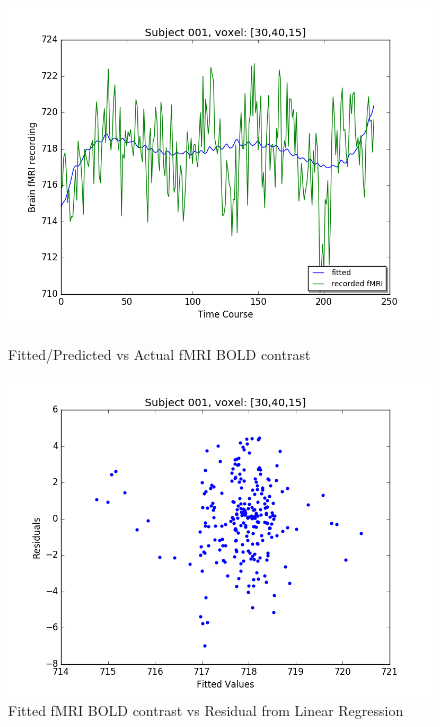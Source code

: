   
\begin{figure}[ht]
\centering
\begin{minipage}[b]{0.45\linewidth}
	\centering
	\includegraphics[width=.8\linewidth]{../images/Fitted_v_Actual.png} 
	\caption{Fitted/Predicted vs Actual fMRI BOLD contrast}
	\label{fig:fit_vs_act}
\end{minipage}	
\quad
\begin{minipage}[b]{0.45\linewidth}
	\centering
		\includegraphics[width=.8\linewidth]{../images/Fitted_v_Residuals.png} 
	\caption{Fitted fMRI BOLD contrast vs Residual from Linear Regression}
	\label{fig:fit_vs_res}
\end{minipage}
\end{figure}





